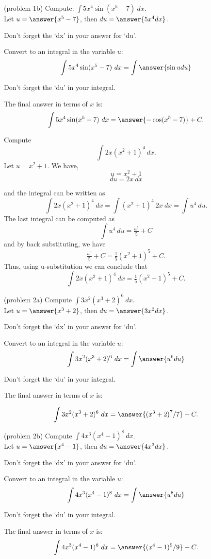 \documentclass[handout]{ximera}
\begin{document}
\begin{problem}(problem 1b) 
Compute: $\displaystyle{\int 5x^4\sin(x^5 -7) \ dx}$.\\
Let $u = \answer{x^5 - 7}$, then $du = \answer{5x^4 dx}$.\\
\begin{hint}
Don't forget the `dx' in your answer for `du'.
\end{hint}
Convert to an integral in the variable $u$:
\[\int 5x^4\sin(x^5 -7) \ dx = \int\answer{\sin u du}\]
\begin{hint}
Don't forget the `du' in your integral.
\end{hint}
The final answer in terms of $x$ is:
\[\int 5x^4\sin(x^5 -7) \ dx = \answer{-\cos(x^5 -7)} +C.\]
\end{problem}


\begin{example}[example 2] 
Compute 
\[\int 2x(x^2 + 1)^4 \ dx.\]
Let $u = x^2 + 1$.  We have,
\[u = x^2 + 1\]
\[du = 2x \ dx\]

and the integral can be written as 
\[\int 2x(x^2 + 1)^4 \ dx = \int (x^2 + 1)^4 \ 2x \  dx = \int u^4 \ du.\]
The last integral can be computed as 
\[\int u^4 \ du = \tfrac{u^5}{5} + C\]
and by back substituting, we have 
\[\tfrac{u^5}{5} + C = \tfrac15(x^2 + 1)^5 + C .\]
Thus, using u-substitution we can conclude that
\[\int 2x(x^2 + 1)^4 \ dx  =  \tfrac15(x^2 + 1)^5 + C .\]
\end{example}



\begin{problem}(problem 2a)
 Compute $\displaystyle{\int 3x^2(x^3 + 2)^6 \ dx}$.\\
Let $u = \answer{x^3 + 2}$, then $du = \answer{3x^2 dx}$.\\
\begin{hint}
Don't forget the `dx' in your answer for `du'.
\end{hint}
Convert to an integral in the variable $u$:
\[\int 3x^2(x^3 + 2)^6 \ dx = \int\answer{u^6 du}\]
\begin{hint}
Don't forget the `du' in your integral.
\end{hint}
The final answer in terms of $x$ is:

\[\int 3x^2(x^3 + 2)^6 \ dx = \answer{(x^3 + 2)^7/7} +C.\]
\end{problem}



\begin{problem}(problem 2b) 
Compute $\displaystyle{\int 4x^3(x^4 -1)^8 \ dx}$.\\
Let $u = \answer{x^4 -1}$, then $du = \answer{4x^3 dx}$.\\
\begin{hint}
Don't forget the `dx' in your answer for `du'.
\end{hint}
Convert to an integral in the variable $u$:
\[\int 4x^3(x^4 -1)^8 \ dx = \int\answer{u^8 du}\]
\begin{hint}
Don't forget the `du' in your integral.
\end{hint}
The final answer in terms of $x$ is:
\[\int 4x^3(x^4 -1)^8 \ dx = \answer{(x^4 -1)^9/9} +C.\]
\end{problem}
\end{document}
